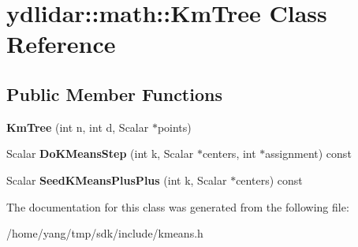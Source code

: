 \hypertarget{classydlidar_1_1math_1_1_km_tree}{}\section{ydlidar\+:\+:math\+:\+:Km\+Tree Class Reference}
\label{classydlidar_1_1math_1_1_km_tree}
\subsection*{Public Member Functions}
\begin{DoxyCompactItemize}
\item 
{\bfseries Km\+Tree} (int n, int d, Scalar $\ast$points)\hypertarget{classydlidar_1_1math_1_1_km_tree_ae6861947a4c5c1c11f8cf39dadb498a7}{}\label{classydlidar_1_1math_1_1_km_tree_ae6861947a4c5c1c11f8cf39dadb498a7}

\item 
Scalar {\bfseries Do\+K\+Means\+Step} (int k, Scalar $\ast$centers, int $\ast$assignment) const \hypertarget{classydlidar_1_1math_1_1_km_tree_adb68234ab0705b8eb26374b26bd481af}{}\label{classydlidar_1_1math_1_1_km_tree_adb68234ab0705b8eb26374b26bd481af}

\item 
Scalar {\bfseries Seed\+K\+Means\+Plus\+Plus} (int k, Scalar $\ast$centers) const \hypertarget{classydlidar_1_1math_1_1_km_tree_a316dafdde55400bdbc273b991cffcd30}{}\label{classydlidar_1_1math_1_1_km_tree_a316dafdde55400bdbc273b991cffcd30}

\end{DoxyCompactItemize}


The documentation for this class was generated from the following file\+:\begin{DoxyCompactItemize}
\item 
/home/yang/tmp/sdk/include/kmeans.\+h\end{DoxyCompactItemize}
